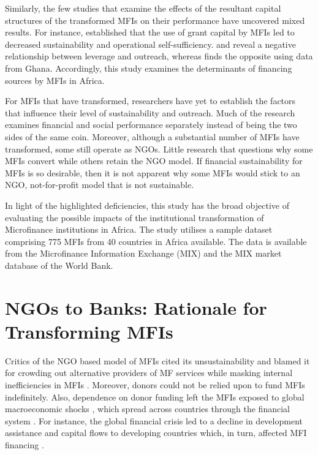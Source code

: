 \documentclass[a4paper, nobind]{templates/ociamthesis}
\begin{document}
Similarly, the few studies that examine the effects of the resultant capital structures of the transformed MFIs on their performance have uncovered mixed results. For instance, \textcite{bogan2012capital} established that the use of grant capital by MFIs led to decreased sustainability and operational self-sufficiency. \textcite{hoque2011commercialization} and \textcite{kar2012does} reveal a negative relationship between leverage and outreach, whereas \textcite{kyereboah2007determinants} finds the opposite using data from Ghana. Accordingly, this study examines the determinants of financing sources by MFIs in Africa.

For MFIs that have transformed, researchers have yet to establish the factors that influence their level of sustainability and outreach. Much of the research examines financial and social performance separately instead of being the two sides of the same coin. Moreover, although a substantial number of MFIs have transformed, some still operate as NGOs. Little research that questions why some MFIs convert while others retain the NGO model. If financial sustainability for MFIs is so desirable, then it is not apparent why some MFIs would stick to an NGO, not-for-profit model that is not sustainable.

In light of the highlighted deficiencies, this study has the broad objective of evaluating the possible impacts of the institutional transformation of Microfinance institutions in Africa. The study utilises a sample dataset comprising 775 MFIs from 40 countries in Africa available. The data is available from the Microfinance Information Exchange (MIX) and the MIX market database of the World Bank.

\hypertarget{ngos-to-banks-rationale-for-transforming-mfis}{%
\section{NGOs to Banks: Rationale for Transforming MFIs}\label{ngos-to-banks-rationale-for-transforming-mfis}}

\noindent Critics of the NGO based model of MFIs cited its unsustainability and blamed it for crowding out alternative providers of MF services \autocite{kota2007microfinance} while masking internal inefficiencies in MFIs \autocite{caseau2020impact}. Moreover, donors could not be relied upon to fund MFIs indefinitely. Also, dependence on donor funding left the MFIs exposed to global macroeconomic shocks \autocite{d2017ngos}, which spread across countries through the financial system \autocite{schnabl2012international}. For instance, the global financial crisis led to a decline in development assistance and capital flows to developing countries which, in turn, affected MFI financing \autocite{leach2012global,wagner2013vulnerability}.
\end{document}
